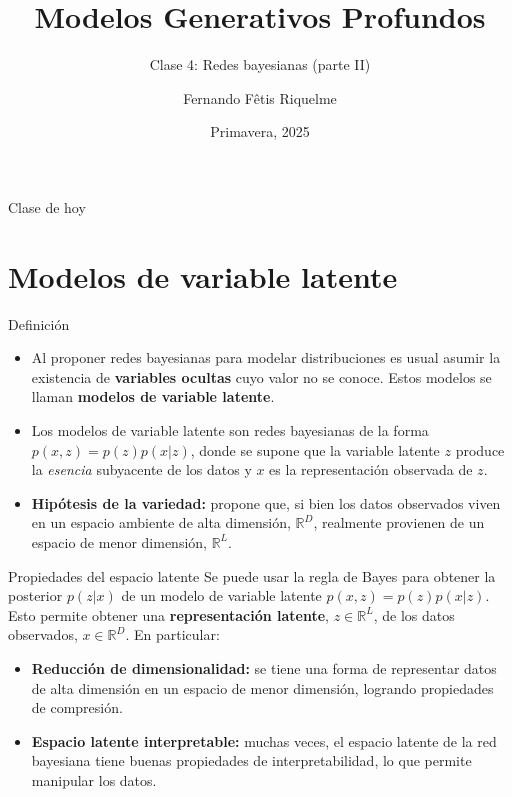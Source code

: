 \documentclass{beamer}
\title{Modelos Generativos Profundos}
\subtitle{Clase 4: Redes bayesianas (parte II)}
\author{Fernando Fêtis Riquelme}
\institute{
    Facultad de Ciencias Físicas y Matemáticas\\
    Universidad de Chile
}
\date{Primavera, 2025}
\newcommand{\R}{\mathbb{R}}
\begin{document}
\begin{frame}
    \titlepage
\end{frame}

\begin{frame}{Clase de hoy}
    \tableofcontents
\end{frame}

\section{Modelos de variable latente}

\begin{frame}{Definición}
    \begin{itemize}
        \item Al proponer redes bayesianas para modelar distribuciones es usual asumir la existencia de \textbf{variables ocultas} cuyo valor no se conoce. Estos modelos se llaman \textbf{modelos de variable latente}.
        \item Los modelos de variable latente son redes bayesianas de la forma $p(x,z)=p(z)p(x|z)$, donde se supone que la variable latente $z$ produce la \textit{esencia} subyacente de los datos y $x$ es la representación observada de $z$.
        \item \textbf{Hipótesis de la variedad:} propone que, si bien los datos observados viven en un espacio ambiente de alta dimensión, $\R^D$, realmente provienen de un espacio de menor dimensión, $\R^L$.
    \end{itemize}
\end{frame}

\begin{frame}{Propiedades del espacio latente}
    Se puede usar la regla de Bayes para obtener la posterior $p(z|x)$ de un modelo de variable latente $p(x,z)=p(z)p(x|z)$. Esto permite obtener una \textbf{representación latente}, $z\in\R^L$, de los datos observados, $x\in\R^D$. En particular:
    \begin{itemize}
        \item \textbf{Reducción de dimensionalidad:} se tiene una forma de representar datos de alta dimensión en un espacio de menor dimensión, logrando propiedades de compresión.
        \item \textbf{Espacio latente interpretable:} muchas veces, el espacio latente de la red bayesiana tiene buenas propiedades de interpretabilidad, lo que permite manipular los datos.
    \end{itemize}
\end{frame}
\end{document}
